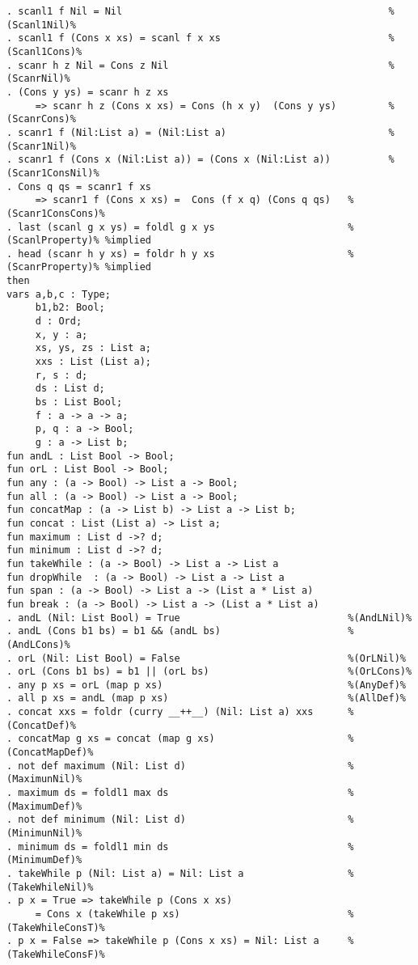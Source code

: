 \begin{Verbatim}
. scanl1 f Nil = Nil                                              %(Scanl1Nil)%
. scanl1 f (Cons x xs) = scanl f x xs                             %(Scanl1Cons)%
. scanr h z Nil = Cons z Nil                                      %(ScanrNil)%
. (Cons y ys) = scanr h z xs
     => scanr h z (Cons x xs) = Cons (h x y)  (Cons y ys)         %(ScanrCons)%
. scanr1 f (Nil:List a) = (Nil:List a)                            %(Scanr1Nil)%
. scanr1 f (Cons x (Nil:List a)) = (Cons x (Nil:List a))          %(Scanr1ConsNil)%
. Cons q qs = scanr1 f xs  
     => scanr1 f (Cons x xs) =  Cons (f x q) (Cons q qs)   %(Scanr1ConsCons)%
. last (scanl g x ys) = foldl g x ys                       %(ScanlProperty)% %implied
. head (scanr h y xs) = foldr h y xs                       %(ScanrProperty)% %implied
then
vars a,b,c : Type;
     b1,b2: Bool;
     d : Ord;
     x, y : a;
     xs, ys, zs : List a;
     xxs : List (List a);
     r, s : d;
     ds : List d;
     bs : List Bool;
     f : a -> a -> a;
     p, q : a -> Bool;
     g : a -> List b;
fun andL : List Bool -> Bool;
fun orL : List Bool -> Bool;
fun any : (a -> Bool) -> List a -> Bool;
fun all : (a -> Bool) -> List a -> Bool;
fun concatMap : (a -> List b) -> List a -> List b;
fun concat : List (List a) -> List a;
fun maximum : List d ->? d;
fun minimum : List d ->? d;
fun takeWhile : (a -> Bool) -> List a -> List a
fun dropWhile  : (a -> Bool) -> List a -> List a
fun span : (a -> Bool) -> List a -> (List a * List a)
fun break : (a -> Bool) -> List a -> (List a * List a)
. andL (Nil: List Bool) = True                             %(AndLNil)%
. andL (Cons b1 bs) = b1 && (andL bs)                      %(AndLCons)%
. orL (Nil: List Bool) = False                             %(OrLNil)%
. orL (Cons b1 bs) = b1 || (orL bs)                        %(OrLCons)%
. any p xs = orL (map p xs)                                %(AnyDef)%
. all p xs = andL (map p xs)                               %(AllDef)%
. concat xxs = foldr (curry __++__) (Nil: List a) xxs      %(ConcatDef)%
. concatMap g xs = concat (map g xs)                       %(ConcatMapDef)%
. not def maximum (Nil: List d)                            %(MaximunNil)%
. maximum ds = foldl1 max ds                               %(MaximumDef)%
. not def minimum (Nil: List d)                            %(MinimunNil)%
. minimum ds = foldl1 min ds                               %(MinimumDef)%
. takeWhile p (Nil: List a) = Nil: List a                  %(TakeWhileNil)%
. p x = True => takeWhile p (Cons x xs) 
     = Cons x (takeWhile p xs)                             %(TakeWhileConsT)%
. p x = False => takeWhile p (Cons x xs) = Nil: List a     %(TakeWhileConsF)%

\end{Verbatim}
